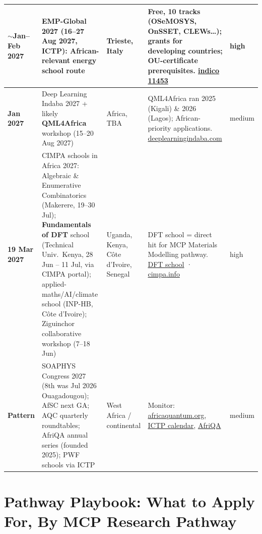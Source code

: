 \documentclass[11pt,a4paper]{article}
\begin{document}
\begin{longtable}{@{}p{3.2cm}p{3.0cm}p{2.5cm}p{5.2cm}p{1.6cm}@{}}
\midrule
\textbf{$\sim$Jan--Feb 2027} & \textbf{EMP-Global 2027} (16--27 Aug 2027, ICTP): African-relevant energy school route & Trieste, Italy & Free, 10 tracks (OSeMOSYS, OnSSET, CLEWs\ldots); grants for developing countries; OU-certificate prerequisites. \href{https://indico.ictp.it/event/11453}{indico 11453} & high \\
\midrule
\textbf{Jan 2027} & Deep Learning Indaba 2027 + likely \textbf{QML4Africa} workshop (15--20 Aug 2027) & Africa, TBA & QML4Africa ran 2025 (Kigali) \& 2026 (Lagos); African-priority applications. \href{https://deeplearningindaba.com/}{deeplearningindaba.com} & medium \\
\midrule
\textbf{19 Mar 2027} & CIMPA schools in Africa 2027: Algebraic \& Enumerative Combinatorics (Makerere, 19--30 Jul); \textbf{Fundamentals of DFT} school (Technical Univ.\ Kenya, 28 Jun -- 11 Jul, via CIMPA portal); applied-maths/AI/climate school (INP-HB, Côte d'Ivoire); Ziguinchor collaborative workshop (7--18 Jun) & Uganda, Kenya, Côte d'Ivoire, Senegal & DFT school = direct hit for MCP Materials Modelling pathway. \href{https://materials-modelling-group.github.io/events/workshops/2026/03/24/cimpa-school-2027.html}{DFT school} · \href{https://www.cimpa.info/}{cimpa.info} & high \\
\midrule
\textbf{Pattern} & SOAPHYS Congress 2027 (8th was Jul 2026 Ouagadougou); AfSC next GA; AQC quarterly roundtables; AfriQA annual series (founded 2025); PWF schools via ICTP & West Africa / continental & Monitor: \href{https://africaquantum.org/}{africaquantum.org}, \href{https://www.ictp.it/home/scientific-calendar}{ICTP calendar}, \href{https://afriqa.ukzn.ac.za/}{AfriQA} & medium \\
\bottomrule
\end{longtable}

\section{Pathway Playbook: What to Apply For, By MCP Research Pathway}
\end{document}
